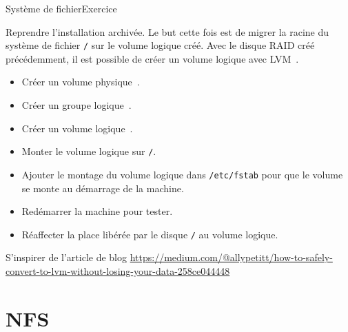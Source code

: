\documentclass{beamer}
\begin{document}
    \begin{frame}{Système de fichier}{Exercice \execcounterdispinc}
        \begin{small}
            Reprendre l'installation archivée.
            Le but cette fois est de migrer la racine du système de fichier \lstinline{/} sur le volume logique créé.
            \bigbreak
            Avec le disque RAID créé précédemment, il est possible de créer un volume logique avec LVM~.
            \begin{itemize}
                \item Créer un volume physique~.
                \item Créer un groupe logique~.
                \item Créer un volume logique~.
                \item Monter le volume logique sur \lstinline{/}.
                \item Ajouter le montage du volume logique dans \lstinline{/etc/fstab} pour que le volume se monte au démarrage de la machine.
                \item Redémarrer la machine pour tester.
                \item Réaffecter la place libérée par le disque \lstinline{/} au volume logique.
            \end{itemize}
            S'inspirer de l'article de blog \url{https://medium.com/@allypetitt/how-to-safely-convert-to-lvm-without-losing-your-data-258ce044448}
        \end{small}
    \end{frame}


    \section{NFS}\label{sec:nfs}
\end{document}
